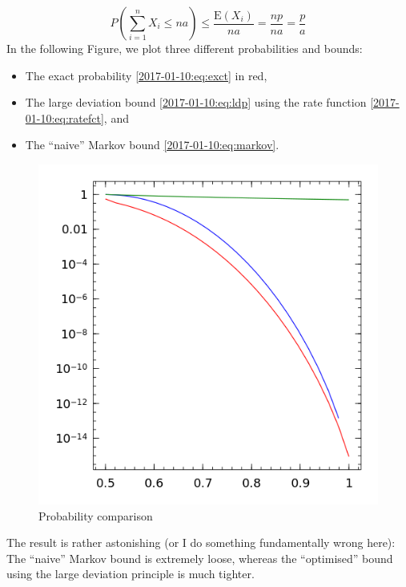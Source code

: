 \begin{equation}
  \label{2017-01-10:eq:markov}
  P\left(\sum_{i=1}^n X_i \leq na \right) \leq \frac{\mathrm{E}(X_i)}{na} = \frac{np}{na} = \frac{p}{a}
\end{equation}
%
In the following Figure, we plot three different probabilities and bounds:

\begin{itemize}
  \item The exact probability \eqref{2017-01-10:eq:exct} in red,
  \item The large deviation bound \eqref{2017-01-10:eq:ldp} using the rate function \eqref{2017-01-10:eq:ratefct}, and
  \item The ``naive'' Markov bound \eqref{2017-01-10:eq:markov}.
\end{itemize}


\begin{figure}[h]
  \includegraphics[scale=0.5]{images/ldp_bernoulli.png}
  \caption{Probability comparison}
\end{figure}

The result is rather astonishing (or I do something fundamentally wrong here): The ``naive'' Markov bound is extremely loose, whereas the ``optimised'' bound using the large deviation principle is much tighter.

